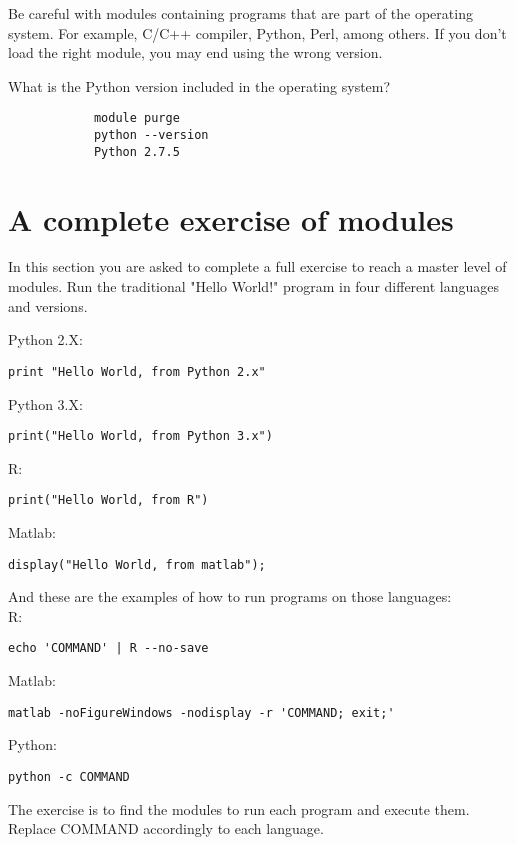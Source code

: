 \begin{warning}
	Be careful with modules containing programs that are part of the operating system. For example, C/C++ compiler, Python, Perl, among others. If you don't load the right module, you may end using the wrong version.
\end{warning}

\begin{questions}
	What is the Python version included in the operating system?
	\begin{answer}
		 \begin{lstlisting}
			module purge
			python --version
			Python 2.7.5
		\end{lstlisting}
	\end{answer}
\end{questions} 

\section{A complete exercise of modules}
In this section you are asked to complete a full exercise to reach a master level of modules.
Run the traditional "Hello World!" program in four different languages and versions.

Python 2.X:
 \begin{lstlisting}[style=command_syntax]
print "Hello World, from Python 2.x" 
\end{lstlisting}
Python 3.X:
 \begin{lstlisting}[style=command_syntax]
print("Hello World, from Python 3.x")
\end{lstlisting}
R:
 \begin{lstlisting}[style=command_syntax]
print("Hello World, from R")
\end{lstlisting}
Matlab:
 \begin{lstlisting}[style=command_syntax]
display("Hello World, from matlab");
\end{lstlisting}

And these are the examples of how to run programs on those languages: \\
R:
 \begin{lstlisting}[style=command_syntax]
echo 'COMMAND' | R --no-save
\end{lstlisting}
Matlab:
 \begin{lstlisting}[style=command_syntax]
matlab -noFigureWindows -nodisplay -r 'COMMAND; exit;'
\end{lstlisting}
Python:
 \begin{lstlisting}[style=command_syntax]
python -c COMMAND
\end{lstlisting}

\begin{steps}
	The exercise is to find the modules to run each program and execute them. Replace COMMAND accordingly to each language.
\end{steps}
